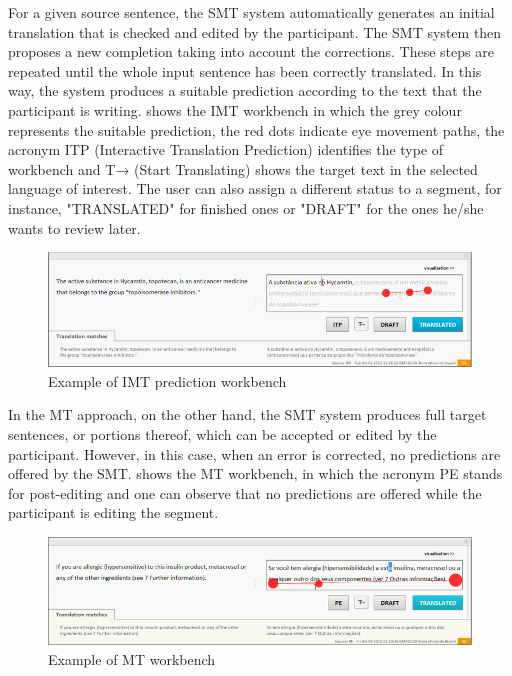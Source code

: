 \documentclass[output=paper]{langsci/langscibook}
\begin{document}
For a given source sentence, the SMT system automatically generates an initial translation that is checked and edited by the participant. The SMT system then proposes a new completion taking into account the corrections. These steps are repeated until the whole input sentence has been correctly translated. In this way, the system produces a suitable prediction according to the text that the participant is writing.  shows the IMT workbench in which the grey colour represents the suitable prediction, the red dots indicate eye movement paths, the acronym ITP (Interactive Translation Prediction) identifies the type of workbench and T→ (Start Translating) shows the target text in the selected language of interest. The user can also assign a different status to a segment, for instance, "TRANSLATED" for finished ones or "DRAFT" for the ones he/she wants to review later.



\begin{figure}
 \includegraphics[width=\textwidth]{figures/Alves2_neu.png}
 \caption{Example of IMT prediction workbench}
 \label{sarto:fig:2}
\end{figure} 


In the MT approach, on the other hand, the SMT system produces full target sentences, or portions thereof, which can be accepted or edited by the participant. However, in this case, when an error is corrected, no predictions are offered by the SMT.  shows the MT workbench, in which the acronym PE stands for post-editing and one can observe that no predictions are offered while the participant is editing the segment.  



  
\begin{figure}
 \includegraphics[width=\textwidth]{figures/Alves3_neu.png}
 \caption{Example of MT workbench}
 \label{sarto:fig:3}
\end{figure} 
 
\end{document}

